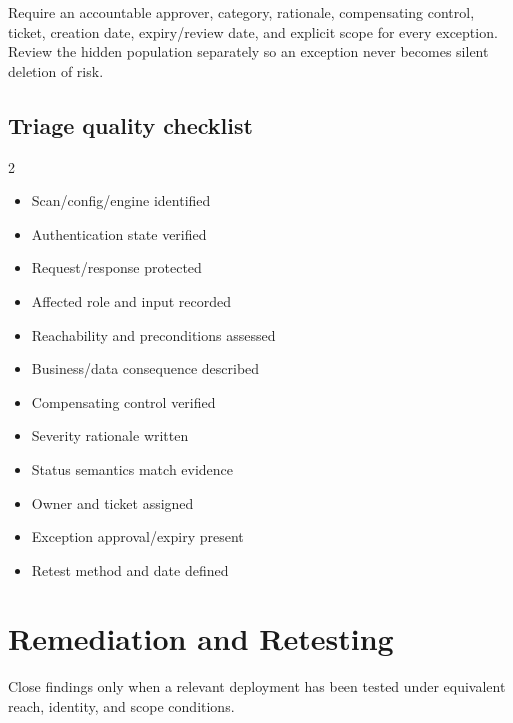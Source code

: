 \documentclass[11pt,letterpaper,oneside]{scrreprt}
\newcommand{\chapterlead}[1]{\begin{tcolorbox}[enhanced,colback=R7Light,colframe=R7Light,boxrule=0pt,borderline west={3pt}{0pt}{R7Orange},arc=0pt,left=9pt,right=9pt,top=7pt,bottom=7pt]#1\end{tcolorbox}}
\begin{document}
\begin{oprec}
Require an accountable approver, category, rationale, compensating control, ticket, creation date, expiry/review date, and explicit scope for every exception. Review the hidden population separately so an exception never becomes silent deletion of risk.
\end{oprec}

\section{Triage quality checklist}
\begin{multicols}{2}
\begin{itemize}
  \item[$\square$] Scan/config/engine identified
  \item[$\square$] Authentication state verified
  \item[$\square$] Request/response protected
  \item[$\square$] Affected role and input recorded
  \item[$\square$] Reachability and preconditions assessed
  \item[$\square$] Business/data consequence described
  \item[$\square$] Compensating control verified
  \item[$\square$] Severity rationale written
  \item[$\square$] Status semantics match evidence
  \item[$\square$] Owner and ticket assigned
  \item[$\square$] Exception approval/expiry present
  \item[$\square$] Retest method and date defined
\end{itemize}
\end{multicols}


\chapter{Remediation and Retesting}
\chapterlead{Close findings only when a relevant deployment has been tested under equivalent reach, identity, and scope conditions.}
\end{document}
